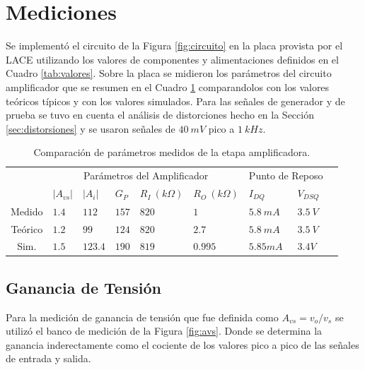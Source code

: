 \documentclass[a4paper, 10pt, spanish]{article}
\begin{document}
\section{Mediciones}\label{sec:mediciones}

Se implementó el circuito de la Figura \ref{fig:circuito} en la placa provista por el LACE utilizando los valores de componentes y alimentaciones definidos en el Cuadro \ref{tab:valores}. Sobre la placa se midieron los parámetros del circuito amplificador que se resumen en el Cuadro \ref{tab:mediciones} comparandolos con los valores teóricos típicos y con los valores simulados. Para las señales de generador y de prueba se tuvo en cuenta el análisis de distorciones hecho en la Sección \ref{sec:distorsiones} y se usaron señales de $40\ mV$ pico a $1\ kHz$.


\begin{table}[h]
\centering
\begin{tabularx}{0.9\textwidth}{XXXXXXXXX}
\hline
\multicolumn{1}{c}{}				& \multicolumn{5}{c}{Parámetros del Amplificador}						& \multicolumn{2}{c}{Punto de Reposo} \\
									\cmidrule(r){2-6}														\cmidrule(r){7-8}
\multicolumn{1}{c}{}				& $|A_{vs}|$  		& $|A_{i}|$ 		& $G_P$ 			& $R_I\ (k\Omega)$ & $R_O\ (k\Omega)$ 		& $I_{DQ}$ 			& $V_{DSQ}$			\\
									\cmidrule(r){2-2} \cmidrule(r){3-3} \cmidrule(r){4-4} 	\cmidrule(r){5-5} 	\cmidrule(r){6-6} \cmidrule(r){7-7} 	\cmidrule(r){8-8}
\multicolumn{1}{c}{Medido}				& $1.4$	& $112$	& $157$ & $820$ & $1$ & $5.8\ mA$& $3.5\ V$\\
\multicolumn{1}{c}{Teórico}        & $1.2$ & $99$ & $124$ & $820$ & $2.7$ & $5.8\ mA$& $3.5\ V$\\
\multicolumn{1}{c}{Sim.}        & $1.5$ & $123.4$ & $190$ & $819$ & $0.995$ & $5.85mA$& $3.4V$\\
\hline

\end{tabularx}
\caption{Comparación de parámetros medidos de la etapa amplificadora.}
\label{tab:mediciones}
\end{table}



\subsection{Ganancia de Tensión}



Para la medición de ganancia de tensión que fue definida como $A_{vs} = v_o/v_s$ se utilizó el banco de medición de la Figura \ref{fig:avs}. Donde se determina la ganancia inderectamente como el cociente de los valores pico a pico de las señales de entrada y salida.
\end{document}
